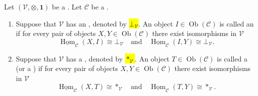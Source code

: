 \begin{definition} \label{definition:initial_and_final_object_of_a_V_enriched_category_in_a_monoidal_category}
Let $(\mathcal{V}, \otimes, \mathbf{1})$ be a . Let $\mathcal{C}$ be a .

\begin{enumerate}
    \item Suppose that $\mathcal{V}$ has an , denoted by \hl{$\bot_{\mathcal{V}}$}. An object $I \in \operatorname{Ob}(\mathcal{C})$ is called an  if for every pair of objects $X, Y \in \operatorname{Ob}(\mathcal{C})$ there exist isomorphisms in $\mathcal{V}$
    $$\underline{\operatorname{Hom}}_{\mathcal{C}}(X, I) \cong \bot_{\mathcal{V}} \quad \text{and} \quad \underline{\operatorname{Hom}}_{\mathcal{C}}(I, Y) \cong \bot_{\mathcal{V}}.$$

    \item Suppose that $\mathcal{V}$ has a , denoted by \hl{$*_{\mathcal{V}}$}. An object $T \in \operatorname{Ob}(\mathcal{C})$ is called a  (or a ) if for every pair of objects $X, Y \in \operatorname{Ob}(\mathcal{C})$ there exist isomorphisms in $\mathcal{V}$
    $$\underline{\operatorname{Hom}}_{\mathcal{C}}(X, T) \cong *_{\mathcal{V}} \quad \text{and} \quad \underline{\operatorname{Hom}}_{\mathcal{C}}(T, Y) \cong *_{\mathcal{V}}.$$
\end{enumerate}
\end{definition}
